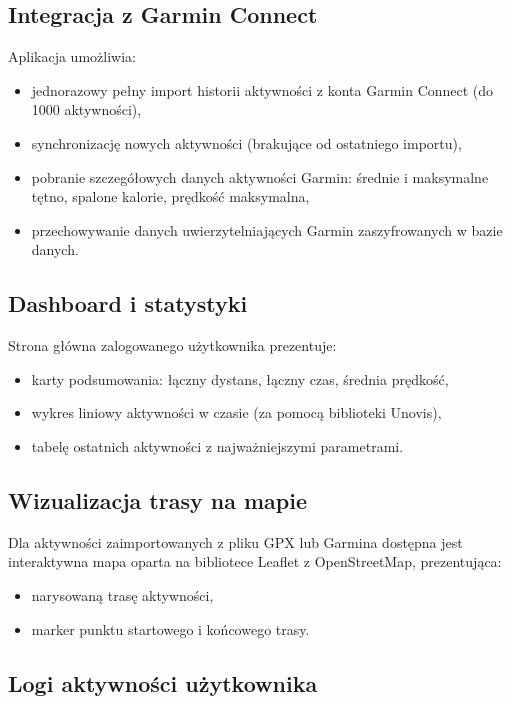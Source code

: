 \documentclass[12pt,a4paper]{report}
\begin{document}
\subsection{Integracja z Garmin Connect}

Aplikacja umożliwia:
\begin{itemize}[noitemsep]
    \item jednorazowy pełny import historii aktywności z konta Garmin Connect (do 1000 aktywności),
    \item synchronizację nowych aktywności (brakujące od ostatniego importu),
    \item pobranie szczegółowych danych aktywności Garmin: średnie i maksymalne tętno, spalone kalorie, prędkość maksymalna,
    \item przechowywanie danych uwierzytelniających Garmin zaszyfrowanych w bazie danych.
\end{itemize}

\subsection{Dashboard i statystyki}

Strona główna zalogowanego użytkownika prezentuje:
\begin{itemize}[noitemsep]
    \item karty podsumowania: łączny dystans, łączny czas, średnia prędkość,
    \item wykres liniowy aktywności w czasie (za pomocą biblioteki Unovis),
    \item tabelę ostatnich aktywności z najważniejszymi parametrami.
\end{itemize}

\subsection{Wizualizacja trasy na mapie}

Dla aktywności zaimportowanych z pliku GPX lub Garmina dostępna jest interaktywna mapa oparta na bibliotece Leaflet z OpenStreetMap, prezentująca:
\begin{itemize}[noitemsep]
    \item narysowaną trasę aktywności,
    \item marker punktu startowego i końcowego trasy.
\end{itemize}

\subsection{Logi aktywności użytkownika}
\end{document}
